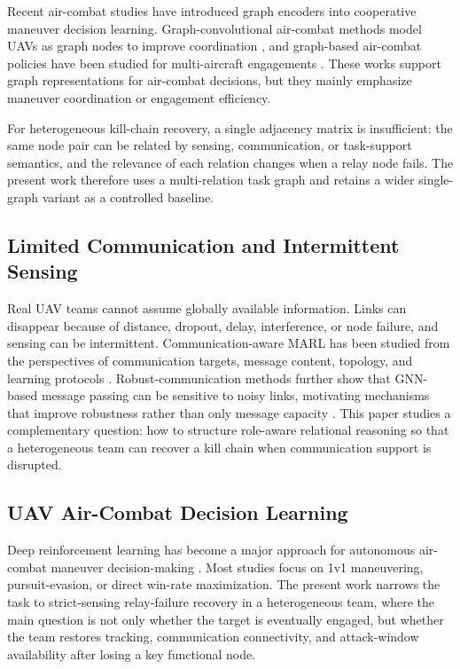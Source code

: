 Recent air-combat studies have introduced graph encoders into cooperative maneuver decision learning. Graph-convolutional air-combat methods model UAVs as graph nodes to improve coordination \cite{ou2024air_combat_gcn_drl}, and graph-based air-combat policies have been studied for multi-aircraft engagements \cite{huo2025graph_air_combat}. These works support graph representations for air-combat decisions, but they mainly emphasize maneuver coordination or engagement efficiency.

For heterogeneous kill-chain recovery, a single adjacency matrix is insufficient: the same node pair can be related by sensing, communication, or task-support semantics, and the relevance of each relation changes when a relay node fails. The present work therefore uses a multi-relation task graph and retains a wider single-graph variant as a controlled baseline.

\subsection{Limited Communication and Intermittent Sensing}

Real UAV teams cannot assume globally available information. Links can disappear because of distance, dropout, delay, interference, or node failure, and sensing can be intermittent. Communication-aware MARL has been studied from the perspectives of communication targets, message content, topology, and learning protocols \cite{zhu2024comm_madrl_survey}. Robust-communication methods further show that GNN-based message passing can be sensitive to noisy links, motivating mechanisms that improve robustness rather than only message capacity \cite{ding2024magi}. This paper studies a complementary question: how to structure role-aware relational reasoning so that a heterogeneous team can recover a kill chain when communication support is disrupted.

\subsection{UAV Air-Combat Decision Learning}

Deep reinforcement learning has become a major approach for autonomous air-combat maneuver decision-making \cite{wang2024air_combat_drl_review}. Most studies focus on 1v1 maneuvering, pursuit-evasion, or direct win-rate maximization. The present work narrows the task to strict-sensing relay-failure recovery in a heterogeneous team, where the main question is not only whether the target is eventually engaged, but whether the team restores tracking, communication connectivity, and attack-window availability after losing a key functional node.

